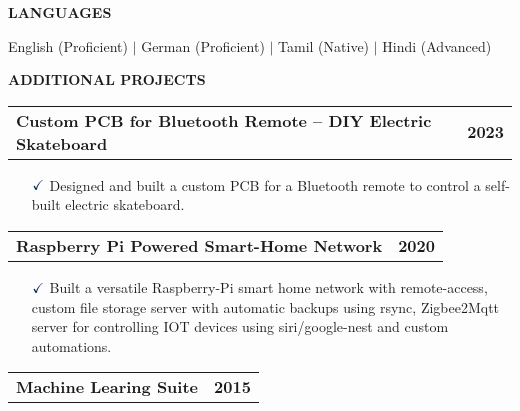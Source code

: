 \documentclass[a4paper,10pt]{article}
\begin{document}
\noindent{\rule{\linewidth}{1.4pt}}
\textbf{LANGUAGES}

\vspace{-0.1cm}
\noindent{\rule{\linewidth}{0.01cm}}

\noindent English (Proficient) {$\vert$} German (Proficient) $\vert$ Tamil (Native) $\vert$ Hindi (Advanced)

\noindent{\rule{\linewidth}{1.4pt}}
\textbf{ADDITIONAL PROJECTS}

\vspace{-0.1cm}
\noindent{\rule{\linewidth}{0.01cm}}

\vspace{0.3cm}
\noindent
\begin{tabular}{ @{\hskip 0pt}m{} >{\raggedleft\arraybackslash}p{} }
    \noindent\textbf{Custom PCB for Bluetooth Remote – DIY Electric Skateboard} & \textbf{2023}
\end{tabular}

{\small
\begin{itemize}
    \item[$\textcolor{highlightcolor}{\checkmark}$]  
    Designed and built a custom PCB for a Bluetooth remote to control a self-built electric skateboard.
\end{itemize}
}

\vspace{0.3cm}
\noindent
\begin{tabular}{ @{\hskip 0pt}m{} >{\raggedleft\arraybackslash}p{} }
    \noindent\textbf{Raspberry Pi Powered Smart-Home Network} & \textbf{2020}
\end{tabular}

{\small
\begin{itemize}
    \item[$\textcolor{highlightcolor}{\checkmark}$]  
            Built a versatile Raspberry-Pi smart home network with
            remote-access, custom file storage server with automatic backups
            using rsync, Zigbee2Mqtt server for controlling IOT devices using
            siri/google-nest and custom automations.
\end{itemize}
}

\vspace{0.3cm}
\noindent
\begin{tabular}{ @{\hskip 0pt}m{} >{\raggedleft\arraybackslash}p{} }
    \noindent\textbf{Machine Learing Suite} & \textbf{2015}
\end{tabular}
\end{document}
